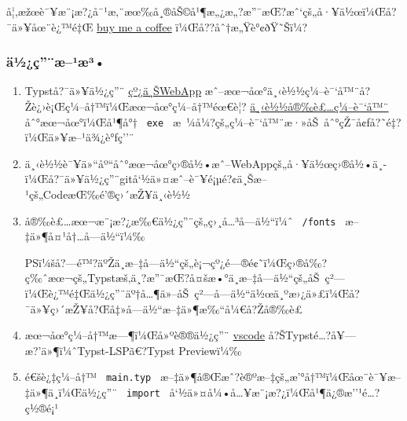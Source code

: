 å¦‚æžœè¯¥æ¨¡æ?¿å¯¹æ‚¨æœ‰å¸®åŠ©å¹¶æ„¿æ„?æ''¯æŒ?æˆ`çš„å·¥ä½œï¼Œå?¯ä»¥åœ¨è¿™é‡Œ
\href{https://www.buymeacoffee.com/jwangl5}{buy me a coffee}
ï¼Œå??åˆ†æ„Ÿè°¢ðŸ˜Šï¼?

\subsubsection{ä½¿ç''¨æ--¹æ³•}\label{uxe4uxbduxe7uxe6uxb9uxe6uxb3}

\begin{enumerate}
\item
  Typstå?¯ä»¥ä½¿ç''¨ \href{https://typst.app/}{çº¿ä¸ŠWebApp}
  æˆ--æœ¬åœ°ä¸‹è½½ç¼--è¯`å™¨å?Žè¿›è¡Œç¼--å†™ï¼Œæœ¬åœ°ç¼--å†™éœ€è¦?
  \href{https://github.com/typst/typst/releases}{ä¸‹è½½å®‰è£\ldots ç¼--è¯`å™¨}
  åˆ°æœ¬åœ°ï¼Œå¹¶å°† \texttt{\ exe\ }
  æ~¼å¼?çš„ç¼--è¯`å™¨æ·»åŠ~åˆ°çŽ¯å¢ƒå?˜é‡?ï¼Œä»¥æ--¹ä¾¿è°ƒç''¨
\item
  ä¸‹è½½è¯¥ä»``åº``åˆ°æœ¬åœ°ç›®å½•æˆ--WebAppçš„å·¥ä½œç›®å½•ä¸­ï¼Œå?¯ä»¥ä½¿ç''¨gitå`½ä»¤æˆ--è¯¥é¡µé?¢ä¸Šæ--¹çš„CodeæŒ‰é'®ç›´æŽ¥ä¸‹è½½

\begin{Shaded}
\begin{Highlighting}[]
\end{Highlighting}
\end{Shaded}
\item
  å®‰è£\ldots æœ¬æ¨¡æ?¿æ‰€ä½¿ç''¨çš„ç›¸å\ldots³å­---ä½``ï¼ˆ
  \texttt{\ /fonts\ } æ--‡ä»¶å¤¹å†\ldots å­---ä½``ï¼‰

  PSï¼šå?---é™?äºŽä¸­æ--‡å­---ä½``çš„è¡¬çº¿é---®é¢˜ï¼Œç›®å‰?ç‰ˆæœ¬çš„Typstæš‚ä¸?æ''¯æŒ?å¤šæ•°ä¸­æ--‡å­---ä½``çš„åŠ~ç²---ï¼Œè¿™é‡Œä½¿ç''¨äº†å\ldots¶ä»--åŠ~ç²---å­---ä½``ä½œä¸ºæ›¿ä»£ï¼Œå?¯ä»¥ç›´æŽ¥å?Œå‡»å­---ä½``æ--‡ä»¶æ‰``å¼€å?Žå®‰è£
\item
  æœ¬åœ°ç¼--å†™æ---¶ï¼Œå»ºè®®ä½¿ç''¨
  \href{https://code.visualstudio.com/}{vscode}
  å?ŠTypsté\ldots?å¥---æ?'ä»¶ï¼ˆTypst-LSPã€?Typst Previewï¼‰
\item
  é€šè¿‡ç¼--å†™ \texttt{\ main.typ\ }
  æ--‡ä»¶å®Œæˆ?è®ºæ--‡çš„æ'°å†™ï¼Œåœ¨è¯¥æ--‡ä»¶ä¸­ï¼Œä½¿ç''¨
  \texttt{\ import\ } å`½ä»¤å¼•å\ldots¥æ¨¡æ?¿ï¼Œå¹¶ä¿®æ''¹é\ldots?ç½®é¡¹


\end{enumerate}
